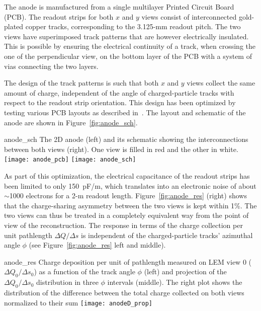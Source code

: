 The anode is manufactured from a single multilayer Printed Circuit
Board (PCB). The readout strips for both $x$ and $y$ views consist of
interconnected gold-plated copper tracks, corresponding to the
3.125-mm readout pitch. The two views have superimposed track patterns
that are however electrically insulated. This is possible by ensuring
the electrical continuity of a track, when crossing the one of the
perpendicular view, on the bottom layer of the PCB with a system of
vias connecting the two layers.

The design of the track patterns is such that both $x$ and $y$ views
collect the same amount of charge, independent of the angle of
charged-particle tracks with respect to the readout strip
orientation. This design has been optimized by testing various PCB
layouts as described in~\cite{Cantini:2013yba}.  The layout and
schematic of the anode are shown in Figure~\ref{fig:anode_sch}.
\begin{cdrfigure}{anode_sch}
{The 2D anode (left) and its schematic showing the  interconnections 
between both views (right). One view is filled  in red and the other in white.}
\texttt{[image: anode\_pcb]} \hspace{0.2cm} \texttt{[image: anode\_sch]}
\end{cdrfigure}

As part of this optimization, the electrical capacitance of the
readout strips has been limited to only 150~pF/m, which translates
into an electronic noise of about $\sim$1000 electrons for a 2-m readout
length.  Figure~\ref{fig:anode_res} (right) shows that the
charge-sharing asymmetry between the two views is kept within 1\%. 
The two views can thus be treated in a completely equivalent way
from the point of view of the reconstruction. The response in terms of
the charge collection per unit pathlength $\Delta Q/\Delta s$ is
independent of the charged-particle tracks' azimuthal angle $\phi$
(see Figure~\ref{fig:anode_res} left and middle).
\begin{cdrfigure}{anode_res} {Charge deposition per unit of pathlength measured on LEM view 0 
($\Delta Q_0/\Delta s_0$) as a function  of the track angle $\phi$ (left) and  projection of the  $\Delta Q_0/\Delta s_0$ distribution in three $\phi$ intervals (middle).  The right plot  shows the distribution of the difference between the total charge  collected on both views normalized to their sum}
\texttt{[image: anodeD\_prop]}
\end{cdrfigure}

